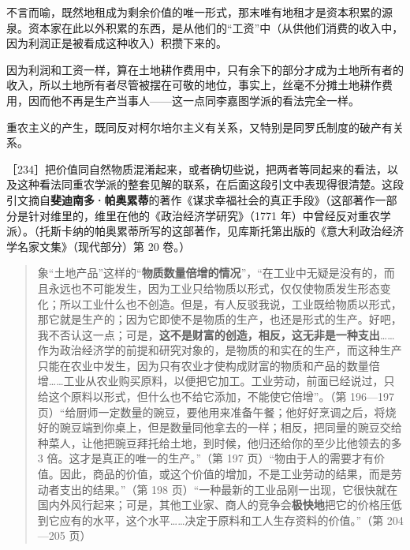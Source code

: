不言而喻，既然地租成为剩余价值的唯一形式，那末唯有地租才是资本积累的源泉。资本家在此以外积累的东西，是从他们的“工资”中（从供他们消费的收入中，因为利润正是被看成这种收入）积攒下来的。

因为利润和工资一样，算在土地耕作费用中，只有余下的部分才成为土地所有者的收入，所以土地所有者尽管被摆在可敬的地位，事实上，丝毫不分摊土地耕作费用，因而他不再是生产当事人——这一点同李嘉图学派的看法完全一样。

重农主义的产生，既同反对柯尔培尔主义有关系，又特别是同罗氏制度的破产有关系。


［234］把价值同自然物质混淆起来，或者确切些说，把两者等同起来的看法，以及这种看法同重农学派的整套见解的联系，在后面这段引文中表现得很清楚。这段引文摘自\textbf{斐迪南多·帕奥累蒂}的著作《谋求幸福社会的真正手段》（这部著作一部分是针对维里的，维里在他的《政治经济学研究》（1771 年）中曾经反对重农学派）。（托斯卡纳的帕奥累蒂所写的这部著作，见库斯托第出版的《意大利政治经济学名家文集》（现代部分）第 20 卷。）

\begin{quote}象“土地产品”这样的“\textbf{物质数量倍增的情况}”，“在工业中无疑是没有的，而且永远也不可能发生，因为工业只给物质以形式，仅仅使物质发生形态变化；所以工业什么也不创造。但是，有人反驳我说，工业既给物质以形式，那它就是生产的；因为它即使不是物质的生产，也还是形式的生产。好吧，我不否认这一点；可是，\textbf{这不是财富的创造，相反，这无非是一种支出}……作为政治经济学的前提和研究对象的，是物质的和实在的生产，而这种生产只能在农业中发生，因为只有农业才使构成财富的物质和产品的数量倍增……工业从农业购买原料，以便把它加工。工业劳动，前面已经说过，只给这个原料以形式，但什么也不给它添加，不能使它倍增”。（第 196—197 页）“给厨师一定数量的豌豆，要他用来准备午餐；他好好烹调之后，将烧好的豌豆端到你桌上，但是数量同他拿去的一样；相反，把同量的豌豆交给种菜人，让他把豌豆拜托给土地，到时候，他归还给你的至少比他领去的多 3 倍。这才是真正的唯一的生产。”（第 197 页）“物由于人的需要才有价值。因此，商品的价值，或这个价值的增加，不是工业劳动的结果，而是劳动者支出的结果。”（第 198 页）“一种最新的工业品刚一出现，它很快就在国内外风行起来；可是，其他工业家、商人的竞争会\textbf{极快地}把它的价格压低到它应有的水平，这个水平……决定于原料和工人生存资料的价值。”（第 204—205 页）\end{quote}
